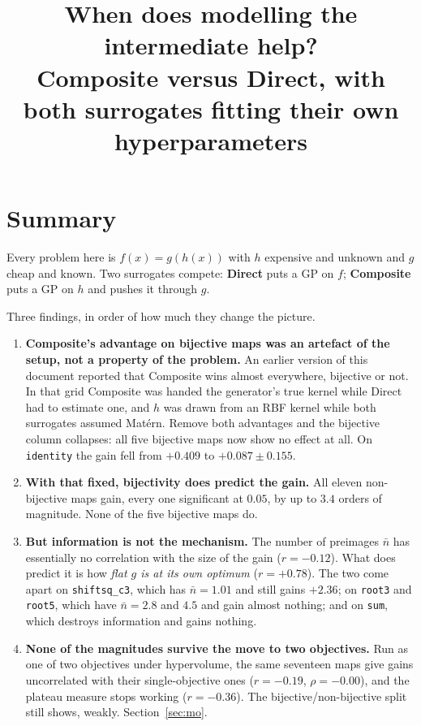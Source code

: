 \documentclass[11pt]{article}
\title{\bfseries When does modelling the intermediate help?\\[2pt]
\large Composite versus Direct, with both surrogates fitting their own hyperparameters}
\date{}
\author{}
\begin{document}
\maketitle
\vspace{-3em}

\section*{Summary}

Every problem here is $f(x)=g(h(x))$ with $h$ expensive and unknown and $g$
cheap and known. Two surrogates compete: \textbf{Direct} puts a GP on $f$;
\textbf{Composite} puts a GP on $h$ and pushes it through $g$.

Three findings, in order of how much they change the picture.

\begin{enumerate}\itemsep3pt
\item \textbf{Composite's advantage on bijective maps was an artefact of the
setup, not a property of the problem.} An earlier version of this document
reported that Composite wins almost everywhere, bijective or not. In that grid
Composite was handed the generator's true kernel while Direct had to estimate
one, and $h$ was drawn from an RBF kernel while both surrogates assumed
Mat\'ern. Remove both advantages and the bijective column collapses: all five
bijective maps now show no effect at all. On \texttt{identity} the gain
fell from $+0.409$ to $+0.087\pm0.155$.

\item \textbf{With that fixed, bijectivity does predict the gain.} All
eleven non-bijective maps gain, every one significant at $0.05$, by up to
$3.4$ orders of magnitude. None of the five bijective maps do.

\item \textbf{But information is not the mechanism.} The number of preimages
$\bar n$ has essentially no correlation with the size of the gain
($r=-0.12$). What does predict it is how \emph{flat $g$ is at its own
optimum} ($r=+0.78$). The two come apart on \texttt{shiftsq\_c3}, which has
$\bar n=1.01$ and still gains $+2.36$; on \texttt{root3} and \texttt{root5},
which have $\bar n=2.8$ and $4.5$ and gain almost nothing; and on
\texttt{sum}, which destroys information and gains nothing.

\item \textbf{None of the magnitudes survive the move to two objectives.}
Run as one of two objectives under hypervolume, the same seventeen maps give
gains uncorrelated with their single-objective ones ($r=-0.19$,
$\rho=-0.00$), and the plateau measure stops working ($r=-0.36$). The
bijective/non-bijective split still shows, weakly. Section~\ref{sec:mo}.
\end{enumerate}
\end{document}

